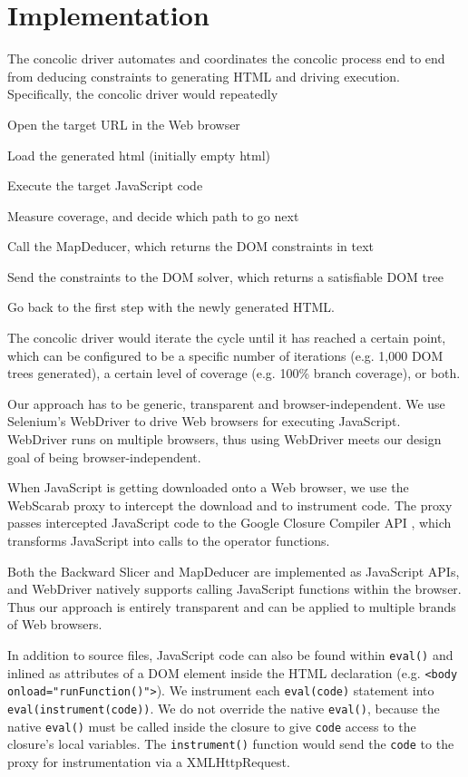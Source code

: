 \section{Implementation}
\label{impl}
The concolic driver automates and coordinates the concolic process end to end from deducing constraints to generating HTML and driving execution.  Specifically, the concolic driver would repeatedly
\begin {compactitem}
\item Open the target URL in the Web browser
\item Load the generated html (initially empty html)
\item Execute the target JavaScript code
\item Measure coverage, and decide which path to go next
\item Call the MapDeducer, which returns the DOM constraints in text
\item Send the constraints to the DOM solver, which returns a satisfiable DOM tree
\item Go back to the first step with the newly generated HTML.
\end{compactitem}
The concolic driver would iterate the cycle until it has reached a certain point, which can be configured to be a specific number of iterations (e.g. 1,000 DOM trees generated), a certain level of coverage (e.g. 100\% branch coverage), or both. 


Our approach has to be generic, transparent and browser-independent.  
We use Selenium's WebDriver \cite{webdriverjs} to drive Web browsers for executing JavaScript.  
WebDriver runs on multiple browsers, thus using WebDriver meets our design goal of being browser-independent.  

When JavaScript is getting downloaded onto a Web browser, we use the WebScarab proxy \cite{webscarab} to intercept the download and to instrument code.  
The proxy passes intercepted JavaScript code to the Google Closure Compiler API \cite{ClosureCompiler}, which transforms JavaScript into calls to the operator functions. 

Both the Backward Slicer and MapDeducer are implemented as JavaScript APIs, and WebDriver natively supports calling JavaScript functions within the browser.  
Thus our approach is entirely transparent and can be applied to multiple brands of Web browsers.    


In addition to source files, JavaScript code can also be found within {\tt eval()} and inlined as attributes of a DOM element inside the HTML declaration (e.g. {\tt <body onload="runFunction()">}).
We instrument each {\tt eval(code)} statement into {\tt eval(instrument(code))}.  We do not override the native {\tt eval()}, because the native {\tt eval()} must be called inside the closure to give {\tt code} access to the closure's local variables.  
The {\tt instrument()} function would send the {\tt code} to the proxy for instrumentation via a XMLHttpRequest.  

